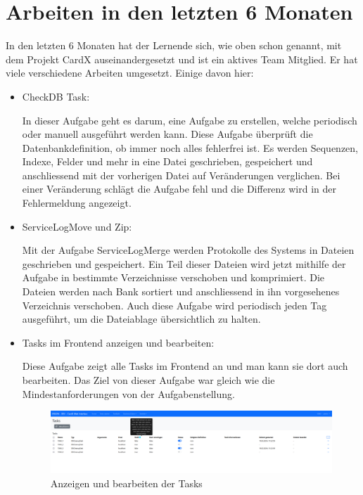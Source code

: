 \section{Arbeiten in den letzten 6 Monaten}\label{sec:arbeiten-in-den-letzten-6-monaten}
In den letzten 6 Monaten hat der Lernende sich, wie oben schon genannt, mit dem Projekt CardX auseinandergesetzt und ist ein aktives Team Mitglied. Er hat viele verschiedene Arbeiten umgesetzt. Einige davon hier:
\begin{itemize}
    \item CheckDB Task:
    
    In dieser Aufgabe geht es darum, eine Aufgabe zu erstellen, welche periodisch oder manuell ausgeführt werden kann. Diese Aufgabe überprüft die Datenbankdefinition, ob immer noch alles fehlerfrei ist. Es werden Sequenzen, Indexe, Felder und mehr in eine Datei geschrieben, gespeichert und anschliessend mit der vorherigen Datei auf Veränderungen verglichen. Bei einer Veränderung schlägt die Aufgabe fehl und die Differenz wird in der Fehlermeldung angezeigt.
    \item ServiceLogMove und Zip:
    
    Mit der Aufgabe ServiceLogMerge werden Protokolle des Systems in Dateien geschrieben und gespeichert. Ein Teil dieser Dateien wird jetzt mithilfe der Aufgabe in bestimmte Verzeichnisse verschoben und komprimiert. Die Dateien werden nach Bank sortiert und anschliessend in ihn vorgesehenes Verzeichnis verschoben. Auch diese Aufgabe wird periodisch jeden Tag ausgeführt, um die Dateiablage übersichtlich zu halten.
    \item Tasks im Frontend anzeigen und bearbeiten:
    
    Diese Aufgabe zeigt alle Tasks im Frontend an und man kann sie dort auch bearbeiten. Das Ziel von dieser Aufgabe war gleich wie die Mindestanforderungen von der Aufgabenstellung.
    \begin{figure}[H]
    	\begin{center}
    		\includegraphics[width=1\textwidth]{ressourcen/show-and-edit-tasks}
    		\caption[Anzeigen und bearbeiten der Tasks]{Anzeigen und bearbeiten der Tasks}\label{fig:show-and-edit-tasks}
    	\end{center}
    \end{figure}
\end{itemize}

